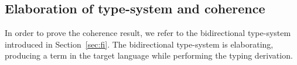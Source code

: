 %
%
%
%
%



\subsection{Elaboration of type-system and coherence} 
In order to prove the coherence result, we refer to the bidirectional type-system introduced in
Section~\ref{sec:fi}. 
The bidirectional type-system is elaborating, producing a term in the target language while
performing the typing derivation.


